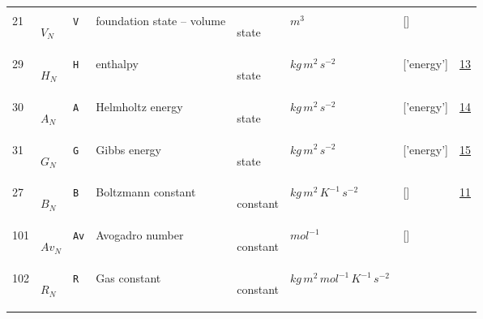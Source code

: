 \begin{longtable}{|p{1cm}|p{3cm}|p{3cm}|p{7cm}|p{3.0cm}|p{3cm}|p{2cm}|p{1cm}|}
             & \\
    21
             & \hypertarget{"v:21"}{ $ {V}_{N} $}
             & \verb|V|
             & foundation state – volume
             & \begin{lay}state \end{lay}
             & $ m^{3} \, $
             & []
             & \\
    29
             & \hypertarget{"v:29"}{ $ {H}_{N} $}
             & \verb|H|
             & enthalpy
             & \begin{lay}state \end{lay}
             & $ kg \,m^{2} \,s^{-2} \, $
             & ['energy']
             & \hyperlink{"e:13"}{ 13 }
                 \\
    30
             & \hypertarget{"v:30"}{ $ {A}_{N} $}
             & \verb|A|
             & Helmholtz energy
             & \begin{lay}state \end{lay}
             & $ kg \,m^{2} \,s^{-2} \, $
             & ['energy']
             & \hyperlink{"e:14"}{ 14 }
                 \\
    31
             & \hypertarget{"v:31"}{ $ {G}_{N} $}
             & \verb|G|
             & Gibbs energy
             & \begin{lay}state \end{lay}
             & $ kg \,m^{2} \,s^{-2} \, $
             & ['energy']
             & \hyperlink{"e:15"}{ 15 }
                 \\
    27
             & \hypertarget{"v:27"}{ $ {B}_{N} $}
             & \verb|B|
             & Boltzmann constant
             & \begin{lay}constant \end{lay}
             & $ kg \,m^{2} \,K^{-1} \,s^{-2} \, $
             & []
             & \hyperlink{"e:11"}{ 11 }
                 \\
    101
             & \hypertarget{"v:101"}{ $ {Av}_{N} $}
             & \verb|Av|
             & Avogadro number
             & \begin{lay}constant \end{lay}
             & $ mol^{-1} \, $
             & []
             & \\
    102
             & \hypertarget{"v:102"}{ $ {R}_{N} $}
             & \verb|R|
             & Gas constant
             & \begin{lay}constant \end{lay}
             & $ kg \,m^{2} \,mol^{-1} \,K^{-1} \,s^{-2} \, $

\end{longtable}
